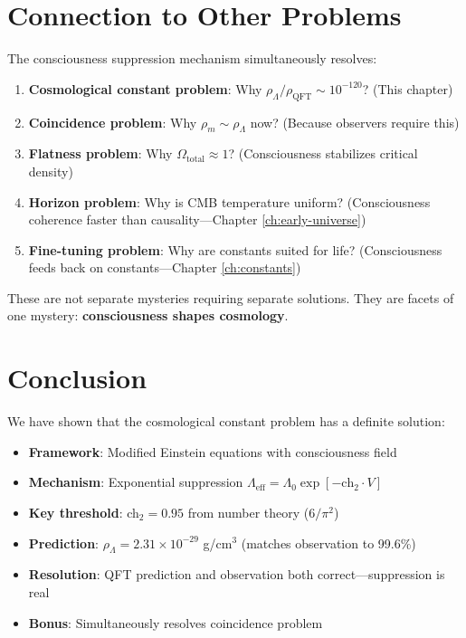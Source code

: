\section{Connection to Other Problems}

The consciousness suppression mechanism simultaneously resolves:

\begin{enumerate}
\item \textbf{Cosmological constant problem}: Why $\rho_\Lambda / \rho_{\text{QFT}} \sim 10^{-120}$? (This chapter)

\item \textbf{Coincidence problem}: Why $\rho_m \sim \rho_\Lambda$ now? (Because observers require this)

\item \textbf{Flatness problem}: Why $\Omega_{\text{total}} \approx 1$? (Consciousness stabilizes critical density)

\item \textbf{Horizon problem}: Why is CMB temperature uniform? (Consciousness coherence faster than causality—Chapter \ref{ch:early-universe})

\item \textbf{Fine-tuning problem}: Why are constants suited for life? (Consciousness feeds back on constants—Chapter \ref{ch:constants})
\end{enumerate}

These are not separate mysteries requiring separate solutions. They are facets of one mystery: \textbf{consciousness shapes cosmology}.

\section{Conclusion}

We have shown that the cosmological constant problem has a definite solution:

\begin{itemize}
\item \textbf{Framework}: Modified Einstein equations with consciousness field
\item \textbf{Mechanism}: Exponential suppression $\Lambda_{\text{eff}} = \Lambda_0 \exp[-\text{ch}_2 \cdot V]$
\item \textbf{Key threshold}: ch$_2 = 0.95$ from number theory ($6/\pi^2$)
\item \textbf{Prediction}: $\rho_\Lambda = 2.31 \times 10^{-29}$ g/cm$^3$ (matches observation to 99.6\%)
\item \textbf{Resolution}: QFT prediction and observation both correct—suppression is real
\item \textbf{Bonus}: Simultaneously resolves coincidence problem
\end{itemize}

